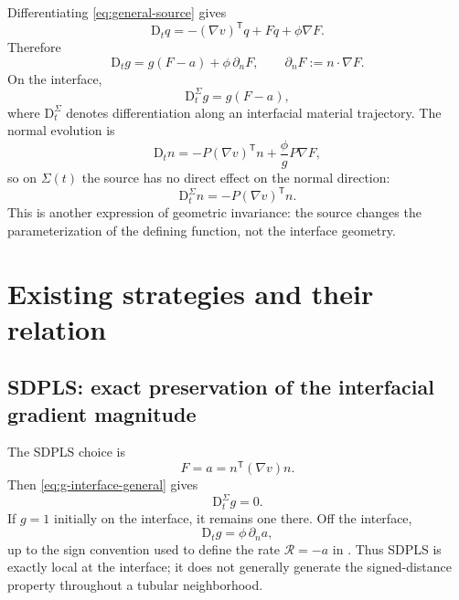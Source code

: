 \documentclass[11pt,a4paper]{article}
\theoremstyle{definition}
\theoremstyle{remark}
\newcommand{\material}{\mathrm{D}_t}
\begin{document}
Differentiating \eqref{eq:general-source} gives
\begin{equation}
  \material q=-(\nabla v)^{\mathsf T}q+Fq+\phi\nabla F.
  \label{eq:q-general}
\end{equation}
Therefore
\begin{equation}
  \boxed{
  \material g=g(F-a)+\phi\,\partial_nF,
  }
  \qquad
  \partial_nF:=n\cdot\nabla F.
  \label{eq:g-general}
\end{equation}
On the interface,
\begin{equation}
  \boxed{
  \material^{\Sigma} g=g(F-a),
  }
  \label{eq:g-interface-general}
\end{equation}
where $\material^{\Sigma}$ denotes differentiation along an interfacial material trajectory. The normal evolution is
\begin{equation}
  \material n=-P(\nabla v)^{\mathsf T}n+\frac{\phi}{g}P\nabla F,
  \label{eq:n-general}
\end{equation}
so on $\Sigma(t)$ the source has no direct effect on the normal direction:
\begin{equation}
  \material^{\Sigma}n=-P(\nabla v)^{\mathsf T}n.
  \label{eq:n-interface}
\end{equation}
This is another expression of geometric invariance: the source changes the parameterization of the defining function, not the interface geometry.

\section{Existing strategies and their relation}

\subsection{SDPLS: exact preservation of the interfacial gradient magnitude}

The SDPLS choice is
\begin{equation}
  F=a=n^{\mathsf T}(\nabla v)n.
  \label{eq:sdpls-source}
\end{equation}
Then \eqref{eq:g-interface-general} gives
\begin{equation}
  \material^{\Sigma}g=0.
  \label{eq:sdpls-preservation}
\end{equation}
If $g=1$ initially on the interface, it remains one there. Off the interface,
\begin{equation}
  \material g=\phi\,\partial_n a,
  \label{eq:sdpls-off-interface}
\end{equation}
up to the sign convention used to define the rate $\mathcal R=-a$ in \cite{FrickeEtAl2022}. Thus SDPLS is exactly local at the interface; it does not generally generate the signed-distance property throughout a tubular neighborhood.
\end{document}
